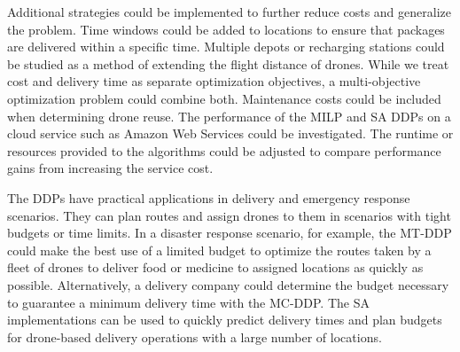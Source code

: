 \documentclass[journal]{IEEEtran}
\begin{document}
Additional strategies could be implemented to further reduce costs and generalize the problem. Time windows could be added to locations to ensure that packages are delivered within a specific time. Multiple depots or recharging stations could be studied as a method of extending the flight distance of drones. While we treat cost and delivery time as separate optimization objectives, a multi-objective optimization problem could combine both. Maintenance costs could be included when determining drone reuse. The performance of the MILP and SA DDPs on a cloud service such as Amazon Web Services \cite{aws} could be investigated. The runtime or resources provided to the algorithms could be adjusted to compare performance gains from increasing the service cost.

The DDPs have practical applications in delivery and emergency response scenarios. They can plan routes and assign drones to them in scenarios with tight budgets or time limits. In a disaster response scenario, for example, the MT-DDP could make the best use of a limited budget to optimize the routes taken by a fleet of drones to deliver food or medicine to assigned locations as quickly as possible. Alternatively, a delivery company could determine the budget necessary to guarantee a minimum delivery time with the MC-DDP. The SA implementations can be used to quickly predict delivery times and plan budgets for drone-based delivery operations with a large number of locations.

\appendices



\end{document}
